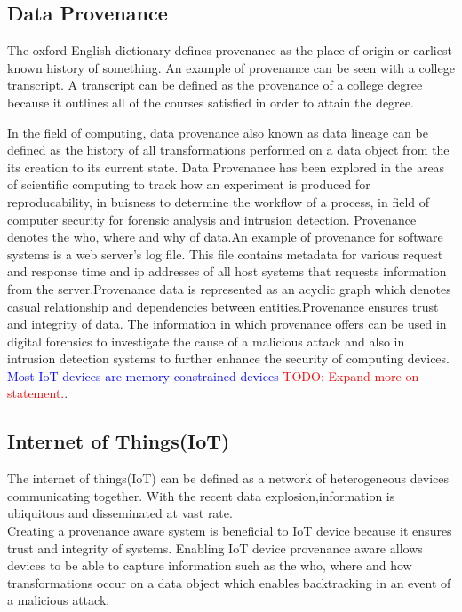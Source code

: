 \subsection{Data Provenance}

The oxford English dictionary defines provenance as the place of origin or earliest known history of something. An example of provenance can be seen with a college transcript. A transcript can be defined as the provenance of a college degree because it outlines all of the courses satisfied in order to attain the degree.
\par In the field of computing, data provenance also known as data lineage can be defined as the history of all transformations performed on a data object from the its creation to its current state. Data Provenance has been explored in the areas of scientific computing to track how an experiment is produced for reproducability, in buisness to determine the workflow of  a process, in field of computer security for forensic analysis and intrusion detection. Provenance denotes the who, where and why of data.An example of provenance for software systems is a web server's log file. This file contains metadata for various request and response time and ip addresses of all host systems that requests information from the server.Provenance data is represented as an acyclic graph which denotes casual relationship and dependencies between entities.Provenance ensures trust and integrity of data. The information in which provenance offers can be used in digital forensics to investigate the cause of a malicious attack and also in intrusion detection systems to further enhance the security of computing devices.  \textcolor{blue}{Most IoT devices are memory constrained devices} \textcolor{red}{TODO: Expand more on statement.}.

 
\subsection{Internet of Things(IoT)}
The internet of things(IoT) can be defined as a network of heterogeneous devices communicating together. With the recent data explosion,information is ubiquitous and  disseminated at vast rate. \\




Creating a provenance aware system is beneficial to IoT device because it ensures trust and  integrity of systems. Enabling IoT device provenance aware allows devices to be able to capture information such as the who, where and how transformations occur on a data object which enables  backtracking in an event of a malicious attack.

